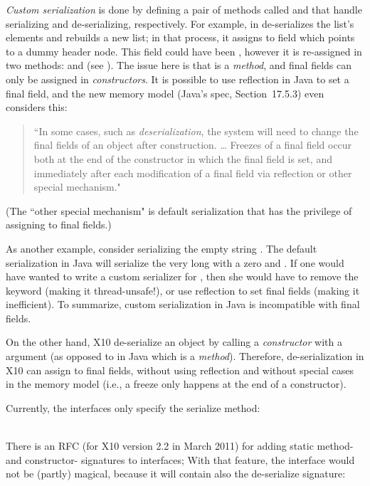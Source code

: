\emph{Custom serialization} is done by defining a pair of methods called
     and 
    that handle serializing and de-serializing, respectively.
For example,  in 
    de-serializes the list's elements and rebuilds a new list;
    in that process, it assigns to field  which points to a dummy header node.
This field could have been , however it is re-assigned in two methods:
     and  (see ).
The issue here is that  is a \emph{method},
    and final fields can only be assigned in
    \emph{constructors}.
It is possible to use reflection in Java to set a final field,
    and the new memory model (Java's spec, Section~17.5.3)
    even considers this:
\begin{quote}
``In some cases, such as \emph{deserialization}, the system will need to change
    the final fields of an object after construction.
\ldots
Freezes of a final field occur both at the end of the constructor in which the final field is set,
    and immediately after each modification of a final field via reflection or other special mechanism."
\end{quote}
(The ``other special mechanism" is default serialization that has the privilege of assigning to final fields.)

As another example, consider serializing the empty string .
The default serialization in Java will serialize the very long  with a zero  and .
If one would have wanted to write a custom serializer for ,
    then she would have to remove the  keyword (making it thread-unsafe!),
    or use reflection to set final fields (making it inefficient).
To summarize, custom serialization in Java is incompatible with final fields.

On the other hand, X10 de-serialize an object by calling a \emph{constructor} with a 
    argument (as opposed to  in Java which is a \emph{method}).
Therefore, de-serialization in X10 can assign to final fields, without using reflection
    and without special cases in the memory model (i.e., a freeze only happens at the end of a constructor).

Currently, the  interfaces only specify the serialize method:

~~~~~~~~\\
There is an RFC (for X10 version 2.2 in March 2011) for adding static method- and constructor- signatures to interfaces;
    With that feature, the  interface would not be (partly) magical,
    because it will contain also the de-serialize signature:

